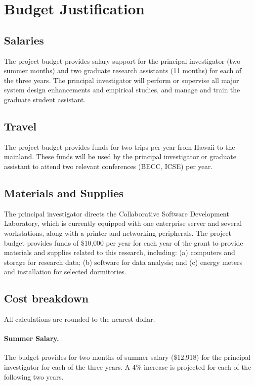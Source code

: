 \documentclass{proposalnsf}
\begin{document}
\section*{Budget Justification}

\renewcommand{\thepage} {F--\arabic{page}}

\subsection*{Salaries}

The project budget provides salary support for the principal investigator
(two summer months) and two graduate research
assistants (11 months) for each of the three years.  The principal
investigator will perform or supervise all major system design enhancements
and empirical studies, and manage and train the graduate student
assistant.

\subsection*{Travel}

The project budget provides funds for two trips per year from Hawaii to the
mainland.  These funds will be used by the principal investigator or
graduate assistant to attend two relevant conferences (BECC, ICSE) per
year.

\subsection*{Materials and Supplies}

The principal investigator directs the Collaborative Software Development
Laboratory, which is currently equipped with one enterprise server and several
workstations, along with a printer and networking peripherals.  The project
budget provides funds of \$10,000 per year for each year of the grant to
provide materials and supplies related to this research, including: (a)
computers and storage for research data; (b) software for data analysis;
and (c) energy meters and installation for selected dormitories.

\subsection*{Cost breakdown}
\label{cost-breakdown}

All calculations are rounded to the nearest dollar.

\paragraph{Summer Salary.}  
The budget provides for two months of summer salary (\$12,918) for the principal investigator for
each of the three years.  A 4\% increase is projected for each of the following two years. 
\end{document}
